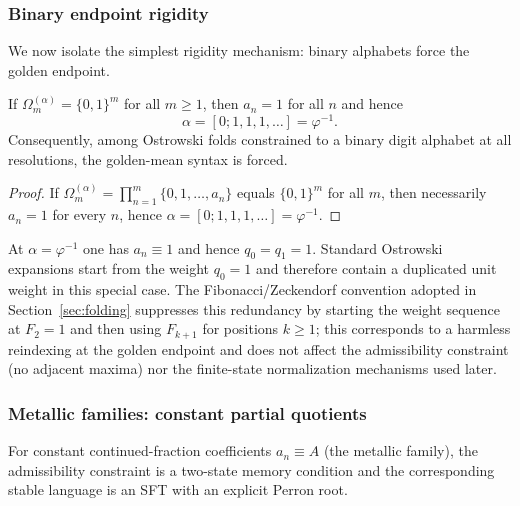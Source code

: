 \subsubsection{Binary endpoint rigidity}
We now isolate the simplest rigidity mechanism: binary alphabets force the golden endpoint.

\begin{proposition}\label{prop:binary-forces-golden}
If $\Omega_m^{(\alpha)}=\{0,1\}^m$ for all $m\ge 1$, then $a_n=1$ for all $n$ and hence
\[
\alpha=[0;1,1,1,\dots]=\varphi^{-1}.
\]
Consequently, among Ostrowski folds constrained to a binary digit alphabet at all resolutions, the golden-mean syntax is forced.
\end{proposition}
\begin{proof}
If $\Omega_m^{(\alpha)}=\prod_{n=1}^{m}\{0,1,\dots,a_n\}$ equals $\{0,1\}^m$ for all $m$, then necessarily $a_n=1$ for every $n$, hence $\alpha=[0;1,1,1,\dots]=\varphi^{-1}$.
\end{proof}

\begin{remark}\label{rem:ostrowski-index-convention}
At $\alpha=\varphi^{-1}$ one has $a_n\equiv 1$ and hence $q_0=q_1=1$.
Standard Ostrowski expansions start from the weight $q_0=1$ and therefore contain a duplicated unit weight in this special case.
The Fibonacci/Zeckendorf convention adopted in Section~\ref{sec:folding} suppresses this redundancy by starting the weight sequence at $F_2=1$ and then using $F_{k+1}$ for positions $k\ge 1$; this corresponds to a harmless reindexing at the golden endpoint and does not affect the admissibility constraint (no adjacent maxima) nor the finite-state normalization mechanisms used later.
\end{remark}

\subsubsection{Metallic families: constant partial quotients}
For constant continued-fraction coefficients $a_n\equiv A$ (the metallic family), the admissibility constraint is a two-state memory condition and the corresponding stable language is an SFT with an explicit Perron root.

